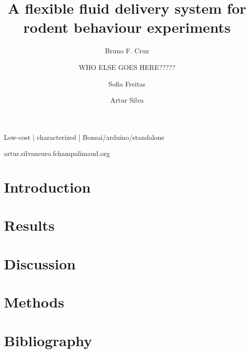 
\title{A flexible fluid delivery system for rodent behaviour experiments}

\author[1,2]{Bruno F. Cruz }
\author[1,2]{WHO ELSE GOES HERE?????}
\author[2]{Sofia Freitas }
\author[1,\Letter]{Artur Silva }
\date{}

\maketitle

\begin{abstract}


\end{abstract}

\begin{keywords}
Low-cost | characterized | Bonsai/arduino/standalone
\end{keywords}

\begin{corrauthor}
artur.silva\at neuro.fchampalimaud.org
\end{corrauthor}

\section*{Introduction}\label{s:introduction}


\section*{Results}\label{s:results}


\section*{Discussion}\label{s:discussion}


\section*{Methods}\label{s:methods}


\section*{Bibliography}



